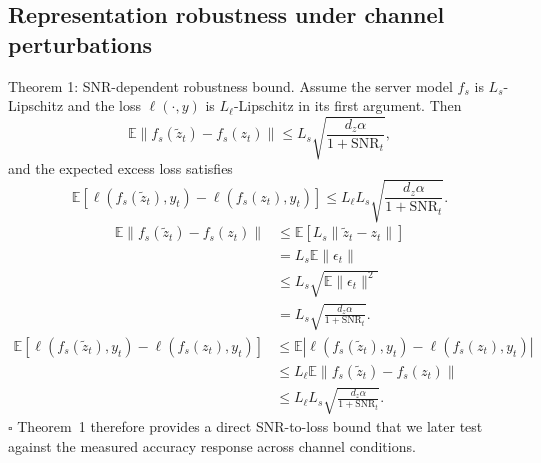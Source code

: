 \documentclass[10pt,journal]{IEEEtran}
\begin{document}
\subsection{Representation robustness under channel perturbations}
Theorem 1: SNR-dependent robustness bound.
Assume the server model $f_s$ is $L_s$-Lipschitz and the loss $\ell(\cdot,y)$ is $L_\ell$-Lipschitz in its first argument. Then
\begin{equation}
\mathbb{E}\|f_s(\tilde{z}_t)-f_s(z_t)\|
\le
L_s\sqrt{\frac{d_z\alpha}{1+\mathrm{SNR}_t}},
\end{equation}
and the expected excess loss satisfies
\begin{equation}
\mathbb{E}\left[\ell(f_s(\tilde{z}_t),y_t)-\ell(f_s(z_t),y_t)\right]
\le
L_\ell L_s\sqrt{\frac{d_z\alpha}{1+\mathrm{SNR}_t}}.
\end{equation}
\begin{equation}
\begin{aligned}
\mathbb{E}\|f_s(\tilde{z}_t)-f_s(z_t)\|
&\le \mathbb{E}\left[L_s\|\tilde{z}_t-z_t\|\right] \\
&= L_s\mathbb{E}\|\epsilon_t\| \\
&\le L_s\sqrt{\mathbb{E}\|\epsilon_t\|^2} \\
&= L_s\sqrt{\frac{d_z\alpha}{1+\mathrm{SNR}_t}}.
\end{aligned}
\end{equation}
\begin{equation}
\begin{aligned}
\mathbb{E}\left[\ell(f_s(\tilde{z}_t),y_t)-\ell(f_s(z_t),y_t)\right]
&\le
\mathbb{E}\left|\ell(f_s(\tilde{z}_t),y_t)-\ell(f_s(z_t),y_t)\right| \\
&\le
L_\ell\mathbb{E}\|f_s(\tilde{z}_t)-f_s(z_t)\| \\
&\le
L_\ell L_s\sqrt{\frac{d_z\alpha}{1+\mathrm{SNR}_t}}.
\end{aligned}
\end{equation}
\hfill $\square$
Theorem~1 therefore provides a direct SNR-to-loss bound that we later test against the measured accuracy response across channel conditions.
\end{document}
